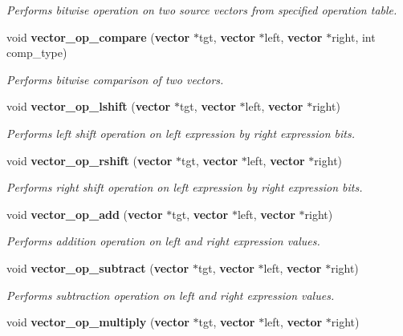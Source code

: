 \begin{CompactItemize}
\begin{CompactList}\small\item\em Performs bitwise operation on two source vectors from specified operation table.\item\end{CompactList}\item 
void {\bf vector\_\-op\_\-compare} ({\bf vector} $\ast$tgt, {\bf vector} $\ast$left, {\bf vector} $\ast$right, int comp\_\-type)
\begin{CompactList}\small\item\em Performs bitwise comparison of two vectors.\item\end{CompactList}\item 
void {\bf vector\_\-op\_\-lshift} ({\bf vector} $\ast$tgt, {\bf vector} $\ast$left, {\bf vector} $\ast$right)
\begin{CompactList}\small\item\em Performs left shift operation on left expression by right expression bits.\item\end{CompactList}\item 
void {\bf vector\_\-op\_\-rshift} ({\bf vector} $\ast$tgt, {\bf vector} $\ast$left, {\bf vector} $\ast$right)
\begin{CompactList}\small\item\em Performs right shift operation on left expression by right expression bits.\item\end{CompactList}\item 
void {\bf vector\_\-op\_\-add} ({\bf vector} $\ast$tgt, {\bf vector} $\ast$left, {\bf vector} $\ast$right)
\begin{CompactList}\small\item\em Performs addition operation on left and right expression values.\item\end{CompactList}\item 
void {\bf vector\_\-op\_\-subtract} ({\bf vector} $\ast$tgt, {\bf vector} $\ast$left, {\bf vector} $\ast$right)
\begin{CompactList}\small\item\em Performs subtraction operation on left and right expression values.\item\end{CompactList}\item 
void {\bf vector\_\-op\_\-multiply} ({\bf vector} $\ast$tgt, {\bf vector} $\ast$left, {\bf vector} $\ast$right)

\end{CompactItemize}
